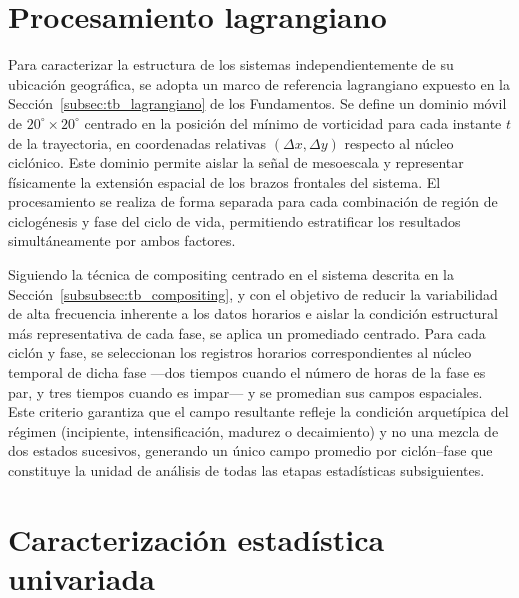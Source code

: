 
\section{Procesamiento lagrangiano}\label{sec:procesamiento_lagrangiano}

Para caracterizar la estructura de los sistemas independientemente de su ubicación geográfica, se adopta un marco de referencia lagrangiano expuesto en la Sección~\ref{subsec:tb_lagrangiano} de los Fundamentos. Se define un dominio móvil de $20^{\circ} \times 20^{\circ}$ centrado en la posición del mínimo de vorticidad para cada instante $t$ de la trayectoria, en coordenadas relativas $(\Delta x, \Delta y)$ respecto al núcleo ciclónico. Este dominio permite aislar la señal de mesoescala y representar físicamente la extensión espacial de los brazos frontales del sistema. El procesamiento se realiza de forma separada para cada combinación de región de ciclogénesis y fase del ciclo de vida, permitiendo estratificar los resultados simultáneamente por ambos factores. 

Siguiendo la técnica de compositing centrado en el sistema descrita en la Sección~\ref{subsubsec:tb_compositing}, y con el objetivo de reducir la variabilidad de alta frecuencia inherente a los datos horarios e aislar la condición estructural más representativa de cada fase, se aplica un promediado centrado. Para cada ciclón y fase, se seleccionan los registros horarios correspondientes al núcleo temporal de dicha fase ---dos tiempos cuando el número de horas de la fase es par, y tres tiempos cuando es impar--- y se promedian sus campos espaciales. Este criterio garantiza que el campo resultante refleje la condición arquetípica del régimen (incipiente, intensificación, madurez o decaimiento) y no una mezcla de dos estados sucesivos, generando un único campo promedio por ciclón--fase que constituye la unidad de análisis de todas las etapas estadísticas subsiguientes.


\section{Caracterización estadística univariada}\label{sec:tecnicas_estadisticas}

